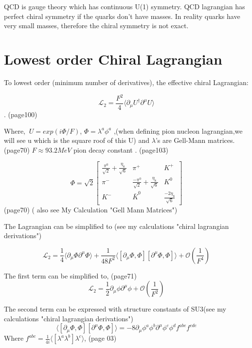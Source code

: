 \documentclass{article}
\begin{document}
QCD is gauge theory which has continuous U(1) symmetry. QCD lagrangian has perfect chiral symmetry if the quarks don't have masses. In reality quarks have very small masses, therefore the chiral symmetry is not exact.

 


\newpage
\section{Lowest order Chiral Lagrangian}
To lowest order (minimum number of derivatives), the effective chiral Lagrangian:



$$\mathcal L_{2}=\frac{F^{2}}{4} \Big \langle \partial_{\mu} U^{\dag} \partial^{\mu} U \Big \rangle $$ \cite{pich1995chiral}. (page100)

Where, $\ U = exp(i \Phi/F) $, $ \Phi = \lambda^{a} \phi^{a}$ ,(when defining pion nucleon lagrangian,we will see u which is the square roof of this U) and  $ \lambda$'s are Gell-Mann matrices. \cite{scherer2003introduction} (page70)  $ F \approx 93.2 MeV$ pion decay constant \cite{pich1995chiral}. (page103)

$$ \Phi = \sqrt{2}  \left[
\begin{array}{ccc}
\frac{\pi^{0}}{\sqrt{2}} +\frac{\eta_{8}}{\sqrt{6}} & \pi^{+} & K^{+} \\
\pi^{-} & \frac{-\pi^{0}}{\sqrt{2}}+\frac{\eta_{8}}{\sqrt{6}} & K^{0}\\
K^{-} & \bar{K}^{0} & \frac{-2 \eta_{8}}{\sqrt{6}}
\end{array}
\right] $$ \cite{scherer2003introduction} (page70) ( also see My Calculation "Gell Mann Matrices") 

\vspace{10mm}
The Lagrangian can be simplified to (see my calculations "chiral lagrangian derivations")

$$\mathcal L_{2}=\frac{1}{4} \Big \langle \partial_{\mu} \Phi \partial^{\mu} \Phi \Big \rangle 
+\frac{1}{48F^{2}} \Big \langle \left[ \partial_{\mu}\Phi, \Phi \right] \left[ \partial^{\mu}\Phi, \Phi \right] \Big \rangle 
+ \mathcal{O} \left( \frac{1}{F^{4}} \right) $$

The first term can be simplified to,\cite{scherer2003introduction} (page71)
$$\mathcal L_{2}=\frac{1}{2}  \partial_{\mu} \phi \partial^{\mu} \phi  
+ \mathcal{O} \left( \frac{1}{F^{2}} \right) $$ 

The second term can be expressed with structure constants of SU3(see my calculations "chiral lagrangian derivations")
$$\Big \langle \left[ \partial_{\mu}\Phi, \Phi \right] \left[ \partial^{\mu}\Phi, \Phi \right] \Big \rangle =
-8 \partial_{\mu} \phi^{a} \phi^{b} \partial^{\mu} \phi^{c} \phi^{d} f^{abe}  f^{cde}$$
Where $ f^{abc} =\frac{1}{4i} \langle \left[ \lambda^{a} \lambda^{b}\right] \lambda^{c}\rangle$, \cite{scherer2003introduction} (page 03)
\end{document}
